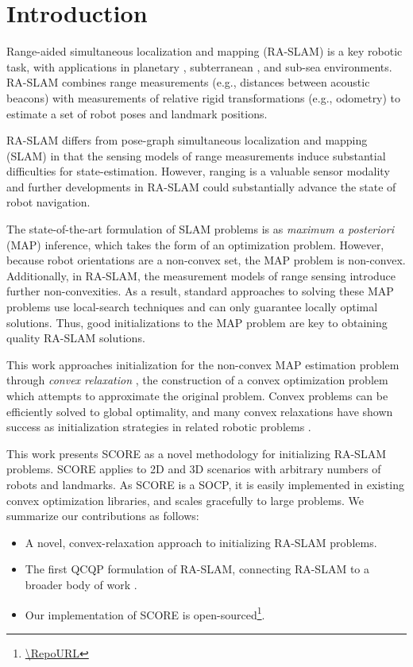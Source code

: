 \section{Introduction}

Range-aided simultaneous localization and mapping (RA-SLAM) is a key robotic
task, with applications in planetary \cite{boroson20iros}, subterranean
\cite{funabiki21ral}, and sub-sea \cite{Newman03icra,Bahr06iser,Bahr12iros}
environments. RA-SLAM combines range measurements (e.g., distances between
acoustic beacons) with measurements of relative rigid transformations (e.g.,
odometry) to estimate a set of robot poses and landmark positions.

RA-SLAM differs from pose-graph simultaneous localization and mapping (SLAM) in
that the sensing models of range measurements induce substantial difficulties
for state-estimation. However, ranging is a valuable sensor modality and
further developments in RA-SLAM could substantially advance the state of robot
navigation.

The state-of-the-art formulation of SLAM problems is as \textit{maximum a
posteriori} (MAP) inference, which takes the form of an optimization problem.
However, because robot orientations are a non-convex set, the MAP problem is
non-convex. Additionally, in RA-SLAM, the measurement models of range sensing
introduce further non-convexities. As a result, standard approaches to solving
these MAP problems use local-search techniques and can only guarantee locally
optimal solutions. Thus, good initializations to the MAP problem are key to
obtaining quality RA-SLAM solutions.

\TitleFigure

This work approaches initialization for the non-convex MAP estimation problem
through \textit{convex relaxation} \cite{boyd04book}, the construction of a
convex optimization problem which attempts to approximate the original problem.
Convex problems can be efficiently solved to global optimality, and many convex
relaxations have shown success as initialization strategies in related robotic
problems
\cite{carlone15icra,carlone15iros,giamou19ral,so07mathematicalprogramming}.

This work presents SCORE as a novel methodology for initializing RA-SLAM
problems. SCORE applies to 2D and 3D scenarios with arbitrary numbers of robots
and landmarks. As SCORE is a SOCP, it is easily implemented in existing
convex optimization libraries, and scales gracefully to large problems. We
summarize our contributions as follows:

\begin{itemize}
      \item A novel, convex-relaxation approach to initializing RA-SLAM
            problems.
      \item The first QCQP formulation of RA-SLAM, connecting
            RA-SLAM to a broader body of work
            \cite{rosen19ijrr,carlone15iros,giamou19ral,so07mathematicalprogramming}.
      \item Our implementation of SCORE is open-sourced\footnote{\url{\RepoURL}}.
\end{itemize}

